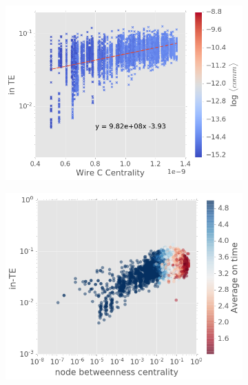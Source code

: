 \documentclass[fleqn,10pt,  amsmath,amssymb,aps]{wlscirep}
\begin{document}
\begin{figure}[h]
	\begin{subfigure}[b]{0.5\textwidth}
		\centering
		\includegraphics[width=1\linewidth]{figure/in_TE.png}

	\end{subfigure}
	\begin{subfigure}[b]{0.5\textwidth}
		\centering
		\includegraphics[width = 1\linewidth]{figure/nbc_TE.png}
	\end{subfigure}


\end{figure}
\end{document}

